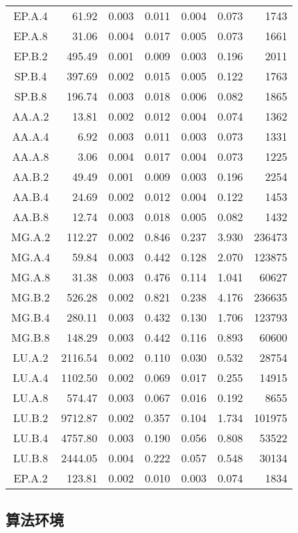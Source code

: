 \begin{ThreePartTable}
\begin{longtable}[c]{c*{6}{r}}
EP.A.4 & 61.92 & 0.003 & 0.011 & 0.004 & 0.073 & 1743 \\
EP.A.8 & 31.06 & 0.004 & 0.017 & 0.005 & 0.073 & 1661 \\
EP.B.2 & 495.49 & 0.001 & 0.009 & 0.003 & 0.196 & 2011 \\
SP.B.4 & 397.69 & 0.002 & 0.015 & 0.005 & 0.122 & 1763 \\
SP.B.8 & 196.74 & 0.003 & 0.018 & 0.006 & 0.082 & 1865 \\
AA.A.2 & 13.81 & 0.002 & 0.012 & 0.004 & 0.074 & 1362 \\
AA.A.4 & 6.92 & 0.003 & 0.011 & 0.003 & 0.073 & 1331 \\
AA.A.8 & 3.06 & 0.004 & 0.017 & 0.004 & 0.073 & 1225 \\
AA.B.2 & 49.49 & 0.001 & 0.009 & 0.003 & 0.196 & 2254 \\
AA.B.4 & 24.69 & 0.002 & 0.012 & 0.004 & 0.122 & 1453 \\
AA.B.8 & 12.74 & 0.003 & 0.018 & 0.005 & 0.082 & 1432 \\
MG.A.2 & 112.27 & 0.002 & 0.846 & 0.237 & 3.930 & 236473 \\
MG.A.4 & 59.84 & 0.003 & 0.442 & 0.128 & 2.070 & 123875 \\
MG.A.8 & 31.38 & 0.003 & 0.476 & 0.114 & 1.041 & 60627 \\
MG.B.2 & 526.28 & 0.002 & 0.821 & 0.238 & 4.176 & 236635 \\
MG.B.4 & 280.11 & 0.003 & 0.432 & 0.130 & 1.706 & 123793 \\
MG.B.8 & 148.29 & 0.003 & 0.442 & 0.116 & 0.893 & 60600 \\
LU.A.2 & 2116.54 & 0.002 & 0.110 & 0.030 & 0.532 & 28754 \\
LU.A.4 & 1102.50 & 0.002 & 0.069 & 0.017 & 0.255 & 14915 \\
LU.A.8 & 574.47 & 0.003 & 0.067 & 0.016 & 0.192 & 8655 \\
LU.B.2 & 9712.87 & 0.002 & 0.357 & 0.104 & 1.734 & 101975 \\
LU.B.4 & 4757.80 & 0.003 & 0.190 & 0.056 & 0.808 & 53522 \\
LU.B.8 & 2444.05 & 0.004 & 0.222 & 0.057 & 0.548 & 30134 \\
EP.A.2 & 123.81 & 0.002 & 0.010 & 0.003 & 0.074 & 1834 \\
    \bottomrule
  \end{longtable}
\end{ThreePartTable}

\subsection{算法环境}

